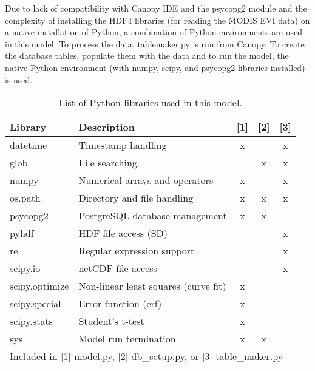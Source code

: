 Due to lack of compatibility with Canopy IDE and the psycopg2 module and the complexity of installing the HDF4 libraries (for reading the MODIS EVI data) on a native installation of Python, a combination of Python environments are used in this model.  
To process the data, table\textunderscore maker.py is run from Canopy.  
To create the database tables, populate them with the data and to run the model, the native Python environment (with numpy, scipy, and psycopg2 libraries installed) is used.

\begin{table}[h]
    \caption{List of Python libraries used in this model.}
    \label{tab:pylib}
    \begin{tabular}{l p{6cm} c c c}
        \hline
        \textbf{Library} & \textbf{Description} & \textbf{[1]} & \textbf{[2]} & \textbf{[3]}\\
        \hline
        datetime & Timestamp handling & x & ~ & x \\
        
        glob & File searching & ~ & x & x \\
        
        numpy & Numerical arrays and operators & x & ~ & x\\
        
        os.path & Directory and file handling & x & x & x\\
        
        psycopg2 & PostgreSQL database management & x & x & ~\\
        
        pyhdf & HDF file access (SD) & ~ & ~ & x\\
        
        re & Regular expression support & ~ & ~ & x\\
        
        scipy.io & netCDF file access & ~ & ~ & x \\
        
        scipy.optimize & Non-linear least squares (curve fit) & x & ~ & 
        ~ \\
        
        scipy.special & Error function (erf) & x & ~ & ~ \\
        
		scipy.stats & Student's t-test & x & ~ & ~ \\

        sys & Model run termination & x & x &  ~ \\
        \hline
        \multicolumn{5}{l}{\footnotesize Included in [1] model.py, [2] db\_setup.py, or [3] table\_maker.py}
    \end{tabular}
\end{table}

